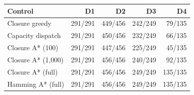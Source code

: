 \begin{tabular}{lrrrr}\toprule
Control & D1 & D2 & D3 & D4\\\midrule
Closure greedy & 291/291 & 449/456 & 242/249 & 79/135\\
Capacity dispatch & 291/291 & 450/456 & 232/249 & 66/135\\
Closure A* (100) & 291/291 & 447/456 & 225/249 & 45/135\\
Closure A* (1,000) & 291/291 & 456/456 & 240/249 & 92/135\\
Closure A* (full) & 291/291 & 456/456 & 249/249 & 135/135\\
Hamming A* (full) & 291/291 & 456/456 & 249/249 & 135/135\\
\bottomrule\end{tabular}
